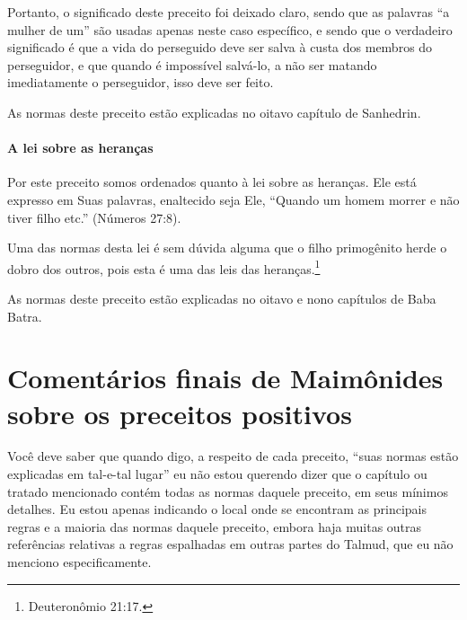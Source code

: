 Portanto, o significado deste preceito foi deixado claro, sendo que as
palavras ``a mulher de um'' são usadas apenas neste caso específico, e
sendo que o verdadeiro significado é que a vida do perseguido deve ser
salva à custa dos membros do perseguidor, e que quando é impossível salvá-lo, a não
ser matando imediatamente o perseguidor, isso deve ser feito.

As normas deste preceito estão explicadas no oitavo capítulo de Sanhedrin.

\paragraph{A lei sobre as heranças}

Por este preceito somos ordenados quanto à lei sobre as heranças. Ele
está expresso em Suas palavras, enaltecido seja Ele, ``Quando um homem
morrer e não tiver filho etc.'' (Números 27:8).

Uma das normas desta lei é sem dúvida alguma que o filho primogênito
herde o dobro dos outros, pois esta é uma das leis das
heranças.\footnote{Deuteronômio 21:17.}

As normas deste preceito estão explicadas no oitavo e nono capítulos de
Baba Batra.

\section{Comentários finais de Maimônides sobre os preceitos positivos}

Você deve saber que quando digo, a respeito de cada preceito, ``suas
normas estão explicadas em tal-e-tal lugar'' eu não estou querendo dizer
que o capítulo ou tratado mencionado contém todas as normas daquele
preceito, em seus mínimos detalhes. Eu estou apenas indicando o local
onde se encontram as principais regras e a maioria das normas daquele
preceito, embora haja muitas outras referências relativas a regras
espalhadas em outras partes do Talmud, que eu não menciono
especificamente.

